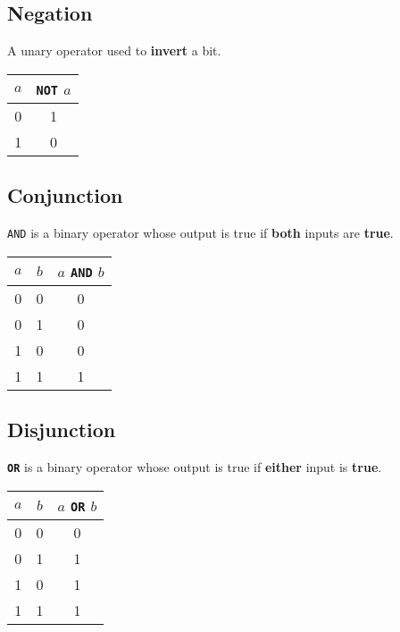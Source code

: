 \documentclass{report}
\newcommand{\keywordinline}[1]{\textcolor[rgb]{0.00,0.50,0.00}{\textbf{\texttt{#1}}}}
\begin{document}
\subsection{Negation}
A unary operator used to \textbf{invert} a bit.
\begin{table}[H]
    \centering
    \begin{tabular}{c c}
        \toprule
        \textbf{\(a\)} & \keywordinline{NOT} \(a\) \\
        \midrule
        0              & 1                         \\
        1              & 0                         \\
        \bottomrule
    \end{tabular}
\end{table}
\subsection{Conjunction}
\texttt{AND} is a binary operator whose output is true if \textbf{both} inputs are \textbf{true}.
\begin{table}[H]
    \centering
    \begin{tabular}{c c c}
        \toprule
        \textbf{\(a\)} & \textbf{\(b\)} & \textbf{\(a\) \texttt{AND} \(b\)} \\
        \midrule
        0              & 0              & 0                                           \\
        0              & 1              & 0                                           \\
        1              & 0              & 0                                           \\
        1              & 1              & 1                                           \\
        \bottomrule
    \end{tabular}
\end{table}
\subsection{Disjunction}
\keywordinline{OR} is a binary operator whose output is true if \textbf{either} input is \textbf{true}.
\begin{table}[H]
    \centering
    \begin{tabular}{c c c}
        \toprule
        \textbf{\(a\)} & \textbf{\(b\)} & \(a\) \keywordinline{OR} \(b\) \\
        \midrule
        0              & 0              & 0                              \\
        0              & 1              & 1                              \\
        1              & 0              & 1                              \\
        1              & 1              & 1                              \\
        \bottomrule
    \end{tabular}
\end{table}
\end{document}
